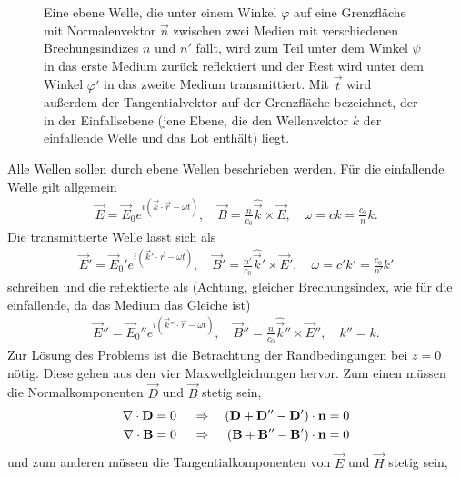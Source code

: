 \begin{figure}[htb]
    \centering
    \tfigReflectionRefractionPlaneWave
    \caption{Eine ebene Welle, die unter einem Winkel $\varphi$ auf eine Grenzfläche mit Normalenvektor $\vec n$ zwischen zwei Medien mit verschiedenen Brechungsindizes $n$ und $n'$ fällt,
        wird zum Teil unter dem Winkel $\psi$ in das erste Medium zurück reflektiert und der Rest wird unter dem Winkel $\varphi'$ in das zweite Medium transmittiert. Mit $\vec t$ wird außerdem der Tangentialvektor auf der Grenzfläche bezeichnet, der in der Einfallsebene (jene Ebene, die den Wellenvektor $k$ der einfallende Welle und das Lot enthält) liegt. }
    \label{fig:reflection_refraction_plane_wave}
\end{figure}

Alle Wellen sollen durch ebene Wellen beschrieben werden. Für die einfallende Welle gilt allgemein
\begin{align*}
    \vec E =\vec E_0 e^{i(\vec k\cdot\vec r-\omega t)}, \quad \vec B =\frac{n}{c_0}\hat{\vec k}\times\vec E, \quad\omega = ck=\frac{c_0}{n}k.
\end{align*}
Die transmittierte Welle lässt sich als
\begin{align*}
    \vec E' =\vec E_0' e^{i(\vec k'\cdot\vec r-\omega t)}, \quad \vec B'  =\frac{n'}{c_0}\hat{\vec k}'\times\vec E', \quad \omega = c'k'=\frac{c_0}{n'}k'
\end{align*}
schreiben und die reflektierte als (Achtung, gleicher Brechungsindex, wie für die einfallende, da das Medium das Gleiche ist)
\begin{align*}
    \vec E'' =\vec E_0'' e^{i(\vec k''\cdot\vec r-\omega t)}, \quad \vec B''  =\frac{n}{c_0}\hat{\vec k}''\times\vec E'', \quad k''  =k.
\end{align*}
Zur Lösung des Problems ist die Betrachtung der Randbedingungen bei $z=0$ nötig.
Diese gehen aus den vier Maxwellgleichungen hervor.
Zum einen müssen die Normalkomponenten $\vec D$ und $\vec B$ stetig sein,
\begin{align}
    \label{eq:ebene_welle_RB_stetige_normalkomponenten}
    \begin{aligned}
        \nabla\cdot \mathbf{D} & =0 &  & \;\Rightarrow\; & \left(\mathbf{D}+\mathbf{D}''-\mathbf{D}'\right)\cdot \mathbf{n} & =0 \\
        \nabla\cdot \mathbf{B} & =0 &  & \;\Rightarrow\; & \left(\mathbf{B}+\mathbf{B}''-\mathbf{B}'\right)\cdot \mathbf{n} & =0
    \end{aligned}
\end{align}
und zum anderen müssen die Tangentialkomponenten von $\vec E$ und $\vec H$ stetig sein,
